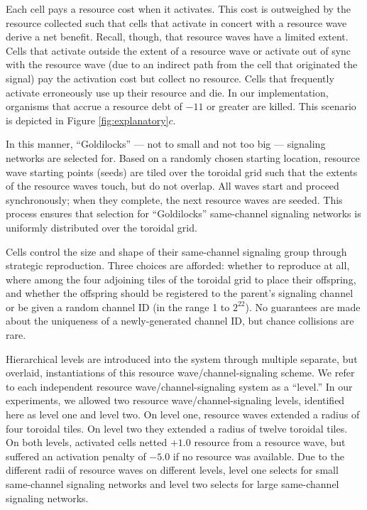 Each cell pays a resource cost when it activates.
This cost is outweighed by the resource collected such that cells that activate in concert with a resource wave derive a net benefit.
Recall, though, that resource waves have a limited extent.
Cells that activate outside the extent of a resource wave or activate out of sync with the resource wave (due to an indirect path from the cell that originated the signal) pay the activation cost but collect no resource.
Cells that frequently activate erroneously use up their resource and die.
In our implementation, organisms that accrue a resource debt of $-11$ or greater are killed.
This scenario is depicted in Figure \ref{fig:explanatory}$c$.

In this manner, ``Goldilocks'' --- not to small and not too big --- signaling networks are selected for.
Based on a randomly chosen starting location, resource wave starting points (seeds) are tiled over the toroidal grid such that the extents of the resource waves touch, but do not overlap.
All waves start and proceed synchronously;
when they complete, the next resource waves are seeded.
This process ensures that selection for ``Goldilocks'' same-channel signaling networks is uniformly distributed over the toroidal grid.

Cells control the size and shape of their same-channel signaling group through strategic reproduction.
Three choices are afforded: whether to reproduce at all, where among the four adjoining tiles of the toroidal grid to place their offspring, and whether the offspring should be registered to the parent's signaling channel or be given a random channel ID (in the range 1 to $2^{22}$).
No guarantees are made about the uniqueness of a newly-generated channel ID, but chance collisions are rare.

Hierarchical levels are introduced into the system through multiple separate, but overlaid, instantiations of this resource wave/channel-signaling scheme.
We refer to each independent resource wave/channel-signaling system as a ``level.''
In our experiments, we allowed two resource wave/channel-signaling levels, identified here as level one and level two.
On level one, resource waves extended a radius of four toroidal tiles.
On level two they extended a radius of twelve toroidal tiles.
On both levels, activated cells netted $+1.0$ resource from a resource wave, but suffered an activation penalty of $-5.0$ if no resource was available.
Due to the different radii of resource waves on different levels, level one selects for small same-channel signaling networks and level two selects for large same-channel signaling networks.

